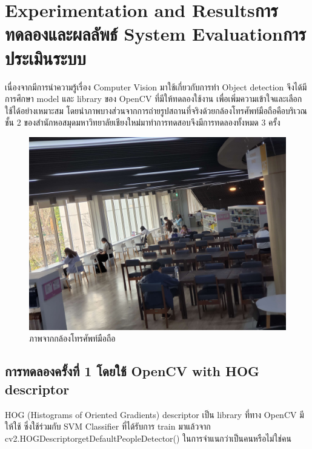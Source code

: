 \chapter{\ifproject%
\ifenglish Experimentation and Results\else การทดลองและผลลัพธ์\fi
\else%
\ifenglish System Evaluation\else การประเมินระบบ\fi
\fi}
\hspace{10mm} เนื่องจากมีการนำความรู้เรื่อง Computer Vision มาใช้เกี่ยวกับการทำ Object detection จึงได้มีการศึกษา model และ library
ของ OpenCV ที่มีให้ทดลองใช้งาน เพื่อเพิ่มความเข้าใจและเลือกใช้ได้อย่างเหมาะสม โดยนำภาพบางส่วนจากการถ่ายรูปสถานที่จริงด้วยกล้องโทรศัพท์มือถือคือบริเวณชั้น 2
ของสำนักหอสมุดมหาวิทยาลัยเชียงใหม่มาทำการทดสอบจึงมีการทดลองทั้งหมด 3 ครั้ง
\begin{figure}[ht]
    \centering
    \includegraphics[scale=0.07]{images/cam2-2.jpg}
    \caption[camera]{ภาพจากกล้องโทรศัพท์มือถือ}
    \label{fig:camera}
\end{figure}
\newpage
\section{การทดลองครั้งที่ 1 โดยใช้ OpenCV with HOG descriptor}
\hspace{10mm}HOG (Histograms of Oriented Gradients) descriptor เป็น library ที่ทาง OpenCV มีให้ใช้
ซึ่งใช้ร่วมกับ SVM Classifier ที่ได้รับการ train มาแล้วจาก cv2.HOGDescriptor\textunderscore getDefaultPeopleDetector()
ในการจำแนกว่าเป็นคนหรือไม่ใช่คน\cite{OpenHOG}

